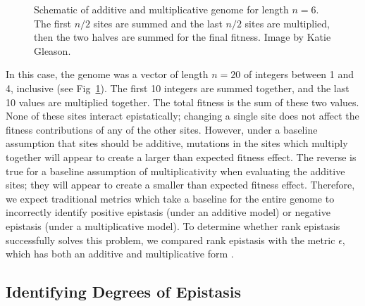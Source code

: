 \begin{figure}
    \centering
    \caption{Schematic of additive and multiplicative genome for length $n=6$. The first $n/2$ sites are summed and the last $n/2$ sites are multiplied, then the two halves are summed for the final fitness. Image by Katie Gleason.}
    \label{fig:method:admult}
\end{figure}

In this case, the genome was a vector of length $n=20$ of integers between 1 and 4, inclusive (see Fig~\ref{fig:method:admult}). The first 10 integers are summed together, and the last 10 values are multiplied together. The total fitness is the sum of these two values. None of these sites interact epistatically; changing a single site does not affect the fitness contributions of any of the other sites. However, under a baseline assumption that sites should be additive, mutations in the sites which multiply together will appear to create a larger than expected fitness effect. The reverse is true for a baseline assumption of multiplicativity when evaluating the additive sites; they will appear to create a smaller than expected fitness effect. Therefore, we expect traditional metrics which take a baseline for the entire genome to incorrectly identify positive epistasis (under an additive model) or negative epistasis (under a multiplicative model). To determine whether rank epistasis successfully solves this problem, we compared rank epistasis with the metric $\epsilon$, which has both an additive and multiplicative form \citep{ostman_impact_2011}. 

\subsection{Identifying Degrees of Epistasis}



